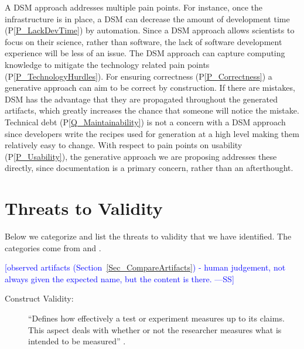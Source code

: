 \documentclass[final, 3p, times, authoryear]{elsarticle}
\newcommand{\authornote}[3]{\textcolor{#1}{[#3 ---#2]}}
\newcommand{\authornote}[3]{}
\newcommand{\wss}[1]{\authornote{blue}{SS}{#1}} %
\newcommand{\ppref}[1]{P\ref{#1}}
\begin{document}
A DSM approach addresses multiple pain points.  For instance, once the
infrastructure is in place, a DSM can decrease the amount of development time
(\ppref{P_LackDevTime}) by automation.  Since a DSM approach allows scientists
to focus on their science, rather than software, the lack of software
development experience will be less of an issue. The DSM approach can capture
computing knowledge to mitigate the technology related pain points
(\ppref{P_TechnologyHurdles}).  For ensuring correctness (\ppref{P_Correctness})
a generative approach can aim to be correct by construction.  If there are
mistakes, DSM has the advantage that they are propagated throughout the
generated artifacts, which greatly increases the chance that someone will notice
the mistake.  Technical debt (\ppref{Q_Maintainability}) is not a concern with a
DSM approach since developers write the recipes used for generation at a high
level making them relatively easy to change.  With respect to pain points on
usability (\ppref{P_Usability}), the generative approach we are proposing
addresses these directly, since documentation is a primary concern, rather than
an afterthought.

\section{Threats to Validity} \label{sec_threats_to_validity}

Below we categorize and list the threats to validity that we have identified.
The categories come from \citet{AmpatzoglouEtAl2019} and \citet{ZhouEtAl2016}.

\wss{observed artifacts (Section~\ref{Sec_CompareArtifacts}) - human judgement,
not always given the expected name, but the content is there.}

\begin{description}
    \item[Construct Validity:] ``Defines how effectively a test or experiment measures
    up to its claims. This aspect deals with whether or not the researcher measures
    what is intended to be measured'' \citep{AmpatzoglouEtAl2019}.
\end{description}
\end{document}
